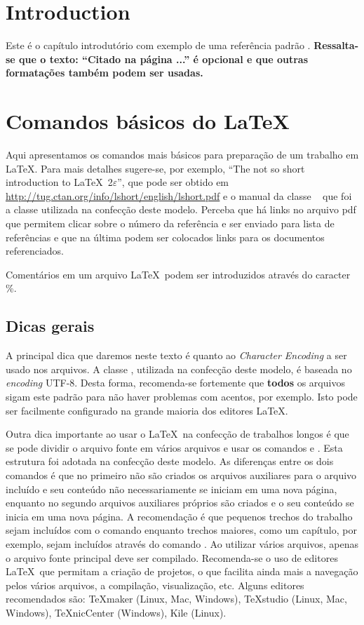 \chapter{Introduction}

Este é o capítulo introdutório com exemplo de uma referência padrão \cite{exemplo}. \textbf{Ressalta-se que o texto: ``Citado na página
...'' é opcional e que outras formatações também podem ser usadas.}
 

\chapter{Comandos básicos do \LaTeX \label{cap1}}


Aqui apresentamos os comandos mais básicos para preparação de um trabalho em \LaTeX. Para mais detalhes sugere-se, por exemplo, ``The
not so short introduction to  \LaTeX\  2$\varepsilon$''\cite{lshort}, que pode ser obtido em
\url{http://tug.ctan.org/info/lshort/english/lshort.pdf} e o manual da classe \abnTeX\ \cite{abntex2classe} que foi a classe utilizada
na confecção deste modelo. Perceba que há links no arquivo pdf que permitem clicar sobre o número da referência e ser enviado para
lista de referências e que na última podem ser colocados links para os documentos referenciados.

Comentários em um arquivo \LaTeX\  podem ser introduzidos através do caracter \%. 

\section{Dicas gerais}

A principal dica que daremos neste texto é quanto ao \emph{Character Encoding} a ser usado nos arquivos. A classe \abnTeX, utilizada na
confecção deste modelo, é baseada no \emph{encoding} UTF-8. Desta forma, recomenda-se fortemente que \textbf{todos} os arquivos sigam
este padrão para não haver problemas com acentos, por exemplo. Isto pode ser facilmente configurado na grande maioria dos editores
\LaTeX.

Outra dica importante ao usar o  \LaTeX\ na confecção de trabalhos longos é que se pode dividir o arquivo fonte em vários arquivos e
usar os comandos \verb++ e \verb++. Esta estrutura foi adotada na confecção deste modelo. As diferenças
entre os dois comandos é que no primeiro não são criados os arquivos auxiliares para o arquivo incluído e seu conteúdo não
necessariamente se iniciam em uma nova página, enquanto no segundo arquivos auxiliares próprios são criados e o seu conteúdo se inicia
em uma nova página. A recomendação é que pequenos trechos do trabalho sejam incluídos com o comando \verb++ enquanto trechos
maiores, como um capítulo, por exemplo, sejam incluídos através do comando \verb++. Ao utilizar vários arquivos, apenas o
arquivo fonte principal deve ser compilado. Recomenda-se o uso de editores   \LaTeX\ que permitam a criação de projetos, o que facilita
ainda mais a navegação pelos vários arquivos, a compilação, visualização, etc.  Alguns editores recomendados são: TeXmaker (Linux, Mac,
Windows), TeXstudio (Linux, Mac, Windows), TeXnicCenter (Windows), Kile (Linux). 

